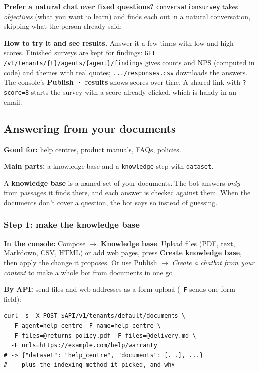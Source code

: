 \documentclass[11pt,a4paper]{article}
\newcommand{\snip}[1]{}
\newcommand{\codeus}{\textunderscore\allowbreak}
\newcommand{\code}[1]{{\renewcommand{\_}{\codeus}\texttt{\upshape #1}}}
\newcommand{\key}[1]{{\renewcommand{\_}{\codeus}\texttt{\color{ckey}#1}}}
\newcommand{\recipehead}[2]{%
  \begin{tcolorbox}[enhanced,colback=boxE,colframe=boxE,arc=2pt,left=8pt,right=8pt,top=4pt,bottom=4pt]
  \small\textbf{\color{keel}Good for:} #1\par
  \textbf{\color{keel}Main parts:} #2
  \end{tcolorbox}}
\begin{document}
\textbf{Prefer a natural chat over fixed questions?} \key{conversation\_survey} takes \emph{objectives} (what you
want to learn) and finds each out in a natural conversation, skipping what the person already said:

\snip{04b_conversation_survey.yaml}

\textbf{How to try it and see results.} Answer it a few times with low and high scores. Finished surveys are kept
for findings: \code{GET /v1/tenants/\{t\}/agents/\{agent\}/findings} gives counts and NPS (computed in code) and
themes with real quotes; \code{.../responses.csv} downloads the answers. The console's \textbf{Publish · results}
shows scores over time. A shared link with \code{?score=8} starts the survey with a score already clicked, which
is handy in an email.

\subsection{Answering from your documents}
\recipehead{help centres, product manuals, FAQs, policies.}{a knowledge base and a \key{knowledge} step with \key{dataset}.}

A \textbf{knowledge base} is a named set of your documents. The bot answers \emph{only} from passages it finds
there, and each answer is checked against them. When the documents don't cover a question, the bot says so
instead of guessing.

\subsubsection{Step 1: make the knowledge base}

\textbf{In the console:} Compose $\rightarrow$ \textbf{Knowledge base}. Upload files (PDF, text, Markdown, CSV,
HTML) or add web pages, press \textbf{Create knowledge base}, then apply the change it proposes. Or use Publish
$\rightarrow$ \emph{Create a chatbot from your content} to make a whole bot from documents in one go.

\textbf{By API:} send files and web addresses as a form upload (\code{-F} sends one form field):

\begin{lstlisting}[style=bashstyle]
curl -s -X POST $API/v1/tenants/default/documents \
  -F agent=help-centre -F name=help_centre \
  -F files=@returns-policy.pdf -F files=@delivery.md \
  -F urls=https://example.com/help/warranty
# -> {"dataset": "help_centre", "documents": [...], ...}
#    plus the indexing method it picked, and why
\end{lstlisting}
\end{document}
